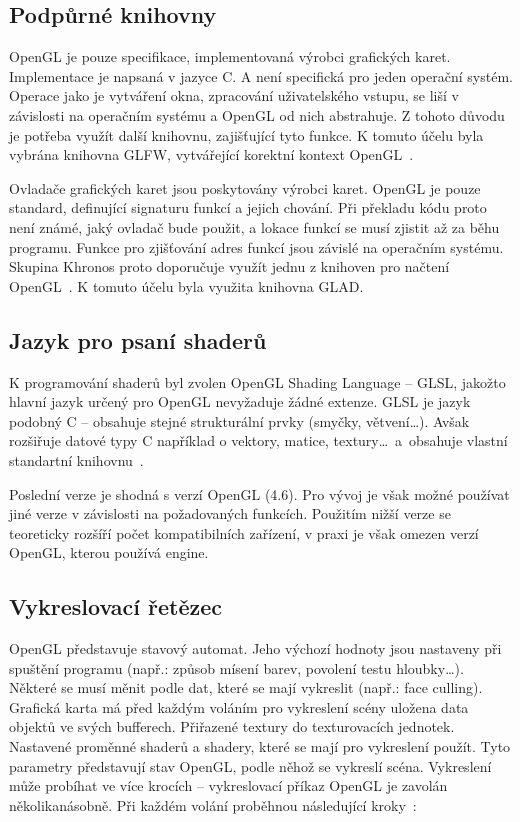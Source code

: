 \documentclass[thesis=M,czech]{FITthesis}[2019/12/23]
\begin{document}
\subsection{Podpůrné knihovny}
OpenGL je pouze specifikace, implementovaná výrobci grafických karet. Implementace je napsaná v jazyce C. A není specifická pro jeden operační systém. Operace jako je vytváření okna, zpracování uživatelského vstupu, se liší v závislosti na operačním systému a OpenGL od nich abstrahuje. Z tohoto důvodu je potřeba využít další knihovnu, zajišťující tyto funkce. K tomuto účelu byla vybrána knihovna GLFW, vytvářející korektní kontext OpenGL~\cite{lopgl_window}.

Ovladače grafických karet jsou poskytovány výrobci karet. OpenGL je pouze standard, definující signaturu funkcí a jejich chování. Při překladu kódu proto není známé, jaký ovladač bude použit, a lokace funkcí se musí zjistit až za běhu programu. Funkce pro zjišťování adres funkcí jsou závislé na operačním systému. Skupina Khronos proto doporučuje využít jednu z knihoven pro načtení OpenGL~\cite{kronos_load_lib}. K tomuto účelu byla využita knihovna GLAD.

\subsection{Jazyk pro psaní shaderů}
K programování shaderů byl zvolen OpenGL Shading Language -- GLSL, jakožto hlavní jazyk určený pro OpenGL nevyžaduje žádné extenze. GLSL je jazyk podobný C – obsahuje stejné strukturální prvky (smyčky, větvení\dots). Avšak rozšiřuje datové typy C například o vektory, matice, textury\dots ~a~obsahuje vlastní standartní knihovnu~\cite{kronos_glsl}.

Poslední verze je shodná s verzí OpenGL (4.6). Pro vývoj je však možné používat jiné verze v závislosti na požadovaných funkcích. Použitím nižší verze se teoreticky rozšíří počet kompatibilních zařízení, v praxi je však omezen verzí OpenGL, kterou používá engine.

\subsection{Vykreslovací řetězec}
OpenGL představuje stavový automat. Jeho výchozí hodnoty jsou nastaveny při spuštění programu (např.: způsob mísení barev, povolení testu hloubky\dots). Některé se musí měnit podle dat, které se mají vykreslit (např.: face culling). Grafická karta má před každým voláním pro vykreslení scény uložena data objektů ve svých bufferech. Přiřazené textury do texturovacích jednotek. Nastavené proměnné shaderů a shadery, které se mají pro vykreslení použít. Tyto parametry představují stav OpenGL, podle něhož se vykreslí scéna. Vykreslení může probíhat ve více krocích -- vykreslovací příkaz OpenGL je zavolán několikanásobně. Při každém volání proběhnou následující kroky~\cite{kronos_render}:
\end{document}
